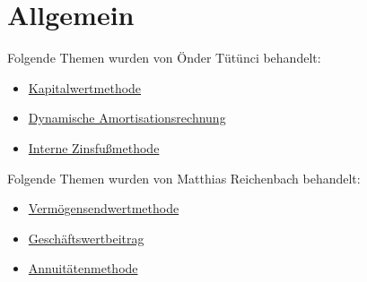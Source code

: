 \chapter{Allgemein}
\label{Einfuehrung}

\bigskip
\bigskip

Folgende Themen wurden von Önder Tütünci behandelt:

\begin{itemize}
    \item \hyperref[Kapitalwertmethode]{Kapitalwertmethode}
    \item \hyperref[Dynamische Amortisationsrechnung]{Dynamische Amortisationsrechnung}
    \item \hyperref[Interne Zinsfussmethode]{Interne Zinsfußmethode}
\end{itemize}

\bigskip
\bigskip

\noindent
Folgende Themen wurden von Matthias Reichenbach behandelt:

\begin{itemize}
    \item \hyperref[Vermoegensendwertmethode]{Vermögensendwertmethode}
    \item \hyperref[Geschaeftswertbeitrag]{Geschäftswertbeitrag}
    \item \hyperref[Annuitaetenmethode]{Annuitätenmethode}
\end{itemize}
